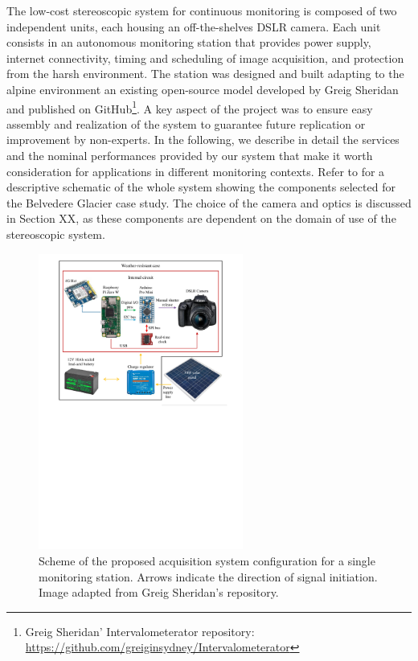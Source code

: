 The low-cost stereoscopic system for continuous monitoring is composed of two independent
units, each housing an off-the-shelves DSLR camera.
Each unit consists in an autonomous monitoring station that provides power supply,
internet connectivity, timing and scheduling of image acquisition, and protection from
the harsh environment.
The station was designed and built adapting to the alpine environment an existing
open-source model developed by Greig Sheridan and published on
GitHub\footnote{\label{foot:greig}Greig Sheridan' Intervalometerator repository:
  \url{https://github.com/greiginsydney/Intervalometerator}}.
A key aspect of the project was to ensure easy assembly and realization of the system to
guarantee future replication or improvement by non-experts.
In the following, we describe in detail the services and the
nominal performances provided by our system that make it worth consideration for
applications in different monitoring contexts. Refer to  for
a descriptive schematic of the whole system showing the components selected for the
Belvedere Glacier case study. The choice of the camera and optics is discussed in Section
XX, as these components are dependent on the domain of use of the
stereoscopic system.

\begin{figure}[h!]
  \centering
  \includegraphics[width=0.6\textwidth]{schema.pdf}
  \caption{Scheme of the proposed acquisition system configuration for a single
    monitoring station. Arrows indicate the direction of signal initiation. Image adapted
    from Greig Sheridan's repository.}
  \label{fig:4:scheme_foto}
\end{figure}

